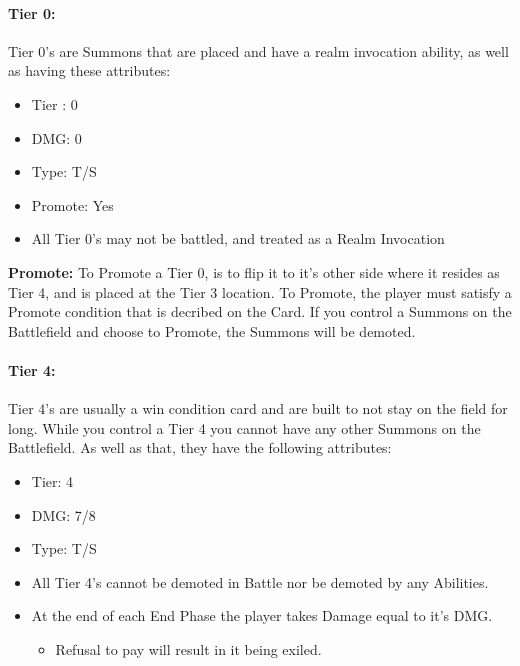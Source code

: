 \documentclass[12pt, letterpaper]{article}
\begin{document}
\paragraph{Tier 0: \\}
Tier 0's are Summons that are placed and have a realm invocation ability, as well as having these attributes: 
\begin{itemize}
    \item Tier : 0
    \item DMG: 0
    \item Type: T/S
    \item Promote: Yes
    \item All Tier 0's may not be battled, and treated as a Realm Invocation
\end{itemize}
\textbf{Promote: } To Promote a Tier 0, is to flip it to it's other side where it resides as Tier 4, and 
is placed at the Tier 3 location. To Promote, the player must satisfy a Promote condition that is decribed on the Card. 
If you control a Summons on the Battlefield and choose to Promote, the Summons will be demoted.

\paragraph{Tier 4: \\}
Tier 4's are usually a win condition card and are built to not stay on the field for long. While you 
control a Tier 4 you cannot have any other Summons on the Battlefield. As well as that, they have the 
following attributes: 
\begin{itemize}
    \item Tier: 4
    \item DMG: 7/8
    \item Type: T/S
    \item All Tier 4's cannot be demoted in Battle nor be demoted by any Abilities. 
    \item At the end of each End Phase the player takes Damage equal to it's DMG. 
    \begin{itemize}
        \item Refusal to pay will result in it being exiled. 
    \end{itemize}
\end{itemize}
\newpage
\end{document}

